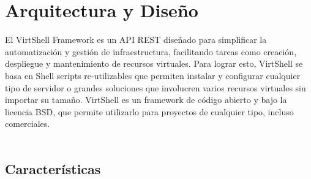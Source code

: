 \chapter{Arquitectura y Diseño}
\label{Arquitectura}

El VirtShell Framework es un API REST diseñado para simplificar la automatización y gestión de infraestructura, facilitando tareas como creación, despliegue y mantenimiento de recursos virtuales. Para lograr esto, VirtShell se basa en Shell scripts re-utilizables que permiten instalar y configurar cualquier tipo de servidor o grandes soluciones que involucren varios recursos virtuales sin importar su tamaño. VirtShell es un framework de código abierto y bajo la licencia BSD, que permite utilizarlo para proyectos de cualquier tipo, incluso comerciales. \\
\\
\section{Características}

